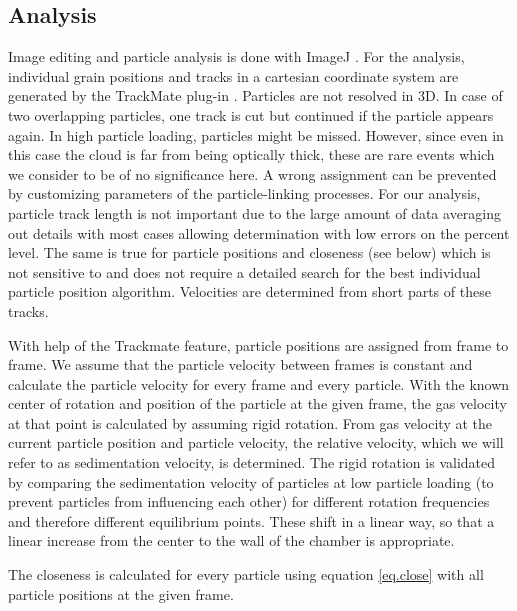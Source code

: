 {\subsection{Analysis}}
{Image editing and particle analysis is done with ImageJ \citep{fiji2012}. For the analysis, individual grain positions and tracks in a cartesian coordinate system are generated by the TrackMate plug-in \citep{trackmate}. 
{Particles are not resolved in 3D}. In case of two overlapping particles, one track is cut but continued if the particle appears again. {In high particle loading, particles might be missed. However, since even in this case the cloud is far from being optically thick, these are rare events which we consider to be of no significance here.} A wrong assignment can be prevented by customizing parameters of the particle-linking processes. For our analysis, particle track length is not important due to the large amount of data averaging out details with most cases allowing determination with low errors on the percent level. The same is true for particle positions and closeness (see below) which is not sensitive to and does not require a detailed search for the best individual particle position algorithm.}
Velocities are determined from short parts of these tracks.

{With help of the Trackmate feature, particle positions are assigned from frame to frame. We assume that the particle velocity between frames is constant and calculate the particle velocity for every frame and every particle. With the known center of rotation and position of the particle at the given frame, the gas velocity at that point is calculated by assuming rigid rotation. From gas velocity at the current particle position and particle velocity, the relative velocity, which we will refer to as sedimentation velocity, is determined.
The rigid rotation is validated by comparing the sedimentation velocity of particles at low particle loading (to prevent particles from influencing each other) for different rotation frequencies and therefore different equilibrium points. These shift in a linear way, so that a linear increase from the center to the wall of the chamber is appropriate.}

{The closeness is calculated for every particle using equation \ref{eq.close} with all particle positions at the given frame}.


